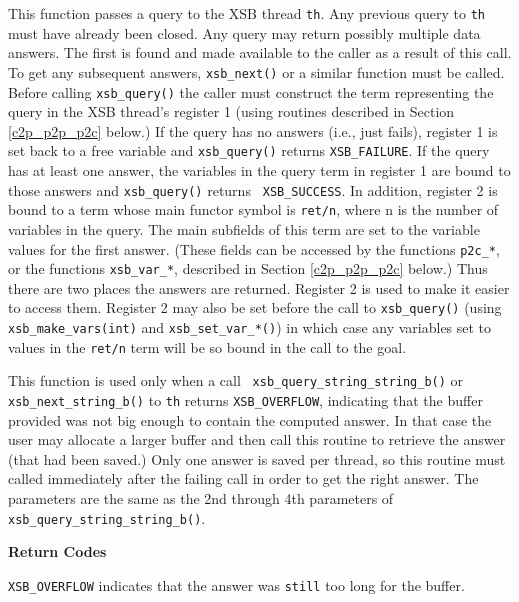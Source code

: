 \begin{description}
  
%
This function passes a query to the XSB thread {\tt th}.  Any previous
query to {\tt th} must have already been closed.  Any query may return
possibly multiple data answers.  The first is found and made available
to the caller as a result of this call.  To get any subsequent
answers, {\tt xsb\_next()} or a similar function must be called.
Before calling {\tt xsb\_query()} the caller must construct the term
representing the query in the XSB thread's register 1 (using routines
described in Section \ref{c2p_p2p_p2c} below.)  If the query has no
answers (i.e., just fails), register 1 is set back to a free variable
and {\tt xsb\_query()} returns {\tt XSB\_FAILURE}.  If the query has
at least one answer, the variables in the query term in register 1 are
bound to those answers and {\tt xsb\_query()} returns {\tt
  XSB\_SUCCESS}.  In addition, register 2 is bound to a term whose
main functor symbol is {\tt ret/n}, where n is the number of variables
in the query. The main subfields of this term are set to the variable
values for the first answer. (These fields can be accessed by the
functions {\tt p2c\_*}, or the functions {\tt xsb\_var\_*}, described
in Section \ref{c2p_p2p_p2c} below.)  Thus there are two places the
answers are returned. Register 2 is used to make it easier to access
them.  Register 2 may also be set before the call to {\tt xsb\_query()}
(using {\tt xsb\_make\_vars(int)} and {\tt xsb\_set\_var\_*()}) in
which case any variables set to values in the {\tt ret/n} term will be
so bound in the call to the goal.

%
This function is used only when a call {\tt
  xsb\_query\_string\_string\_b()} or {\tt xsb\_next\_string\_b()} to
{\tt th} returns {\tt XSB\_OVERFLOW}, indicating that the buffer
provided was not big enough to contain the computed answer.  In that
case the user may allocate a larger buffer and then call this routine
to retrieve the answer (that had been saved.)  Only one answer is
saved per thread, so this routine must called immediately after the
failing call in order to get the right answer.  The parameters are the
same as the 2nd through 4th parameters of {\tt
  xsb\_query\_string\_string\_b()}.

{\bf Return Codes}  
\bi
\item {\tt XSB\_OVERFLOW} indicates that the answer was {\tt still}
  too long for the buffer.  
\ei


\end{description}
